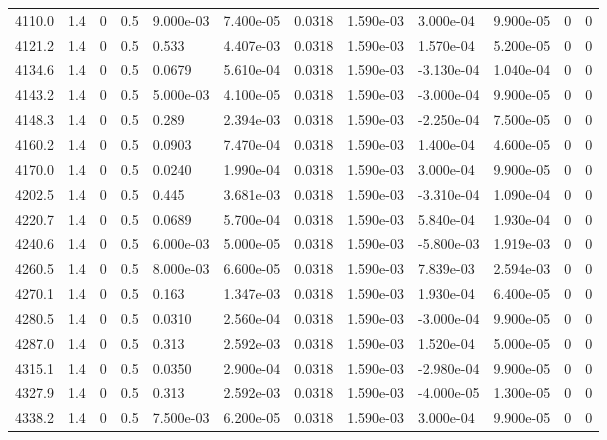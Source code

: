 \documentclass[preview]{standalone}
\begin{document}
{{{{{{{{{\begin{tabular}{L{1.2cm}C{1.2cm} C{0.3cm}C{0.5cm} C{1.4cm}C{1.4cm} C{1.4cm}C{1.4cm} C{1.6cm}C{1.6cm} C{1.6cm}C{1.6cm}}
  4110.0  &   1.4  & 0     & 0.5 &  9.000e-03  & 7.400e-05  &  0.0318&   1.590e-03& 3.000e-04 & 9.900e-05   &  0 & 0  \\ 
  4121.2  &   1.4  & 0     & 0.5 &  0.533  & 4.407e-03  &  0.0318&   1.590e-03& 1.570e-04 & 5.200e-05   &  0 & 0  \\ 
  4134.6  &   1.4  & 0     & 0.5 &  0.0679  & 5.610e-04  &  0.0318&   1.590e-03& -3.130e-04 & 1.040e-04   &  0 & 0  \\ 
  4143.2  &   1.4  & 0     & 0.5 &  5.000e-03  & 4.100e-05  &  0.0318&   1.590e-03& -3.000e-04 & 9.900e-05   &  0 & 0  \\ 
  4148.3  &   1.4  & 0     & 0.5 &  0.289  & 2.394e-03  &  0.0318&   1.590e-03& -2.250e-04 & 7.500e-05   &  0 & 0  \\ 
  4160.2  &   1.4  & 0     & 0.5 &  0.0903  & 7.470e-04  &  0.0318&   1.590e-03& 1.400e-04 & 4.600e-05   &  0 & 0  \\ 
  4170.0  &   1.4  & 0     & 0.5 &  0.0240  & 1.990e-04  &  0.0318&   1.590e-03& 3.000e-04 & 9.900e-05   &  0 & 0  \\ 
  4202.5  &   1.4  & 0     & 0.5 &  0.445  & 3.681e-03  &  0.0318&   1.590e-03& -3.310e-04 & 1.090e-04   &  0 & 0  \\ 
  4220.7  &   1.4  & 0     & 0.5 &  0.0689  & 5.700e-04  &  0.0318&   1.590e-03& 5.840e-04 & 1.930e-04   &  0 & 0  \\ 
  4240.6  &   1.4  & 0     & 0.5 &  6.000e-03  & 5.000e-05  &  0.0318&   1.590e-03& -5.800e-03 & 1.919e-03   &  0 & 0  \\ 
  4260.5  &   1.4  & 0     & 0.5 &  8.000e-03  & 6.600e-05  &  0.0318&   1.590e-03& 7.839e-03 & 2.594e-03   &  0 & 0  \\ 
  4270.1  &   1.4  & 0     & 0.5 &  0.163  & 1.347e-03  &  0.0318&   1.590e-03& 1.930e-04 & 6.400e-05   &  0 & 0  \\ 
  4280.5  &   1.4  & 0     & 0.5 &  0.0310  & 2.560e-04  &  0.0318&   1.590e-03& -3.000e-04 & 9.900e-05   &  0 & 0  \\ 
  4287.0  &   1.4  & 0     & 0.5 &  0.313  & 2.592e-03  &  0.0318&   1.590e-03& 1.520e-04 & 5.000e-05   &  0 & 0  \\ 
  4315.1  &   1.4  & 0     & 0.5 &  0.0350  & 2.900e-04  &  0.0318&   1.590e-03& -2.980e-04 & 9.900e-05   &  0 & 0  \\ 
  4327.9  &   1.4  & 0     & 0.5 &  0.313  & 2.592e-03  &  0.0318&   1.590e-03& -4.000e-05 & 1.300e-05   &  0 & 0  \\ 
  4338.2  &   1.4  & 0     & 0.5 &  7.500e-03  & 6.200e-05  &  0.0318&   1.590e-03& 3.000e-04 & 9.900e-05   &  0 & 0  \\ 

\end{tabular}}}}}}}}}}
\end{document}
